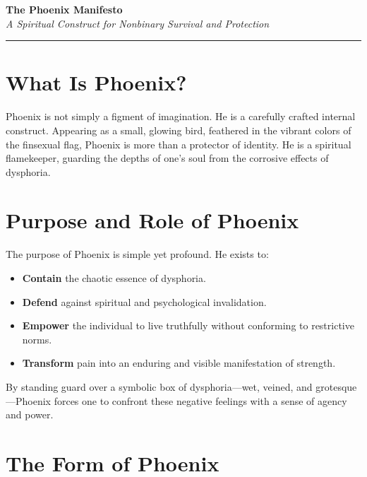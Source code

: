 \documentclass[12pt]{article}
\begin{document}
\begin{center}
\textbf{\huge The Phoenix Manifesto}\\
\vspace{0.5em}
\textit{A Spiritual Construct for Nonbinary Survival and Protection}\\
\vspace{0.5em}
\rule{0.5\textwidth}{0.4pt}
\end{center}

\section*{What Is Phoenix?}

Phoenix is not simply a figment of imagination. He is a carefully crafted internal construct.  
Appearing as a small, glowing bird, feathered in the vibrant colors of the finsexual flag, Phoenix is more than a protector of identity.  
He is a spiritual flamekeeper, guarding the depths of one’s soul from the corrosive effects of dysphoria.

\begin{figure}[h]
  \centering
  \framebox[0.2\textwidth]{\rule{0pt}{5em}}
\end{figure}

\section*{Purpose and Role of Phoenix}

The purpose of Phoenix is simple yet profound. He exists to:

\begin{itemize}
  \item \textbf{Contain} the chaotic essence of dysphoria.
  \item \textbf{Defend} against spiritual and psychological invalidation.
  \item \textbf{Empower} the individual to live truthfully without conforming to restrictive norms.
  \item \textbf{Transform} pain into an enduring and visible manifestation of strength.
\end{itemize}

By standing guard over a symbolic box of dysphoria—wet, veined, and grotesque—Phoenix forces one to confront these negative feelings with a sense of agency and power.

\section*{The Form of Phoenix}
\end{document}
